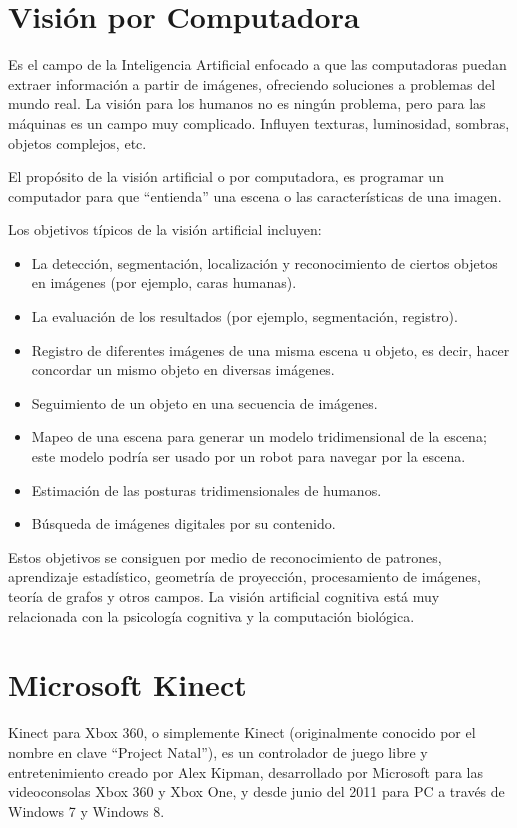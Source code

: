 \section{Visión por Computadora}
Es el campo de la Inteligencia Artificial enfocado a que las computadoras puedan extraer información a partir de imágenes, ofreciendo soluciones a problemas del mundo real. La visión para los humanos no es ningún problema, pero para las máquinas es un campo muy complicado. Influyen texturas, luminosidad, sombras, objetos complejos, etc.

El propósito de la visión artificial o por computadora, es programar un computador para que ``entienda'' una escena o las características de una imagen.

Los objetivos típicos de la visión artificial incluyen:

\begin{itemize}
	\itemsep1pt \parskip1pt 
	\item La detección, segmentación, localización y reconocimiento de ciertos objetos en imágenes (por ejemplo, caras humanas). \item La evaluación de los resultados (por ejemplo, segmentación, registro).
	\item Registro de diferentes imágenes de una misma escena u objeto, es decir, hacer concordar un mismo objeto en diversas imágenes.
	\item Seguimiento de un objeto en una secuencia de imágenes.
	\item Mapeo de una escena para generar un modelo tridimensional de la escena; este modelo podría ser usado por un robot para navegar por la escena.
	\item Estimación de las posturas tridimensionales de humanos.
	\item Búsqueda de imágenes digitales por su contenido.
\end{itemize}

Estos objetivos se consiguen por medio de reconocimiento de patrones, aprendizaje estadístico, geometría de proyección, procesamiento de imágenes, teoría de grafos y otros campos. La visión artificial cognitiva está muy relacionada con la psicología cognitiva y la computación biológica.

\section{Microsoft Kinect}
Kinect para Xbox 360, o simplemente Kinect (originalmente conocido por el nombre en clave ``Project Natal''), es un controlador de juego libre y entretenimiento creado por Alex Kipman, desarrollado por Microsoft para las videoconsolas Xbox 360 y Xbox One, y desde junio del 2011 para PC a través de Windows 7 y Windows 8.

